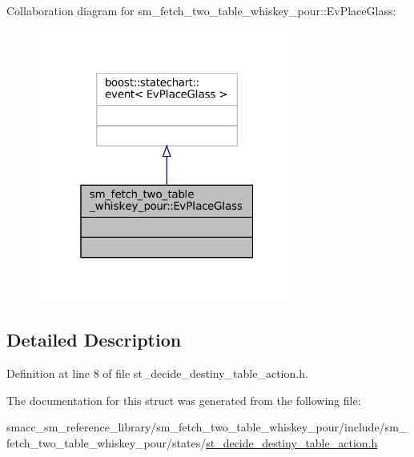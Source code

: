 Collaboration diagram for sm\+\_\+fetch\+\_\+two\+\_\+table\+\_\+whiskey\+\_\+pour\+:\+:Ev\+Place\+Glass\+:
\nopagebreak
\begin{figure}[H]
\begin{center}
\leavevmode
\includegraphics[width=241pt]{structsm__fetch__two__table__whiskey__pour_1_1EvPlaceGlass__coll__graph}
\end{center}
\end{figure}


\subsection{Detailed Description}


Definition at line 8 of file st\+\_\+decide\+\_\+destiny\+\_\+table\+\_\+action.\+h.



The documentation for this struct was generated from the following file\+:\begin{DoxyCompactItemize}
\item 
smacc\+\_\+sm\+\_\+reference\+\_\+library/sm\+\_\+fetch\+\_\+two\+\_\+table\+\_\+whiskey\+\_\+pour/include/sm\+\_\+fetch\+\_\+two\+\_\+table\+\_\+whiskey\+\_\+pour/states/\hyperlink{st__decide__destiny__table__action_8h}{st\+\_\+decide\+\_\+destiny\+\_\+table\+\_\+action.\+h}\end{DoxyCompactItemize}
